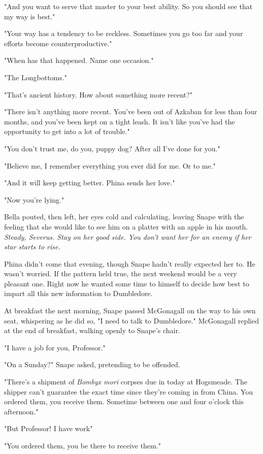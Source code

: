 "And you want to serve that master to your best ability. So you should see that my way is best."

"Your way has a tendency to be reckless. Sometimes you go too far and your efforts become counterproductive."

"When has that happened. Name one occasion."

"The Longbottoms."

"That's ancient history. How about something more recent?"

"There isn't anything more recent. You've been out of Azkaban for less than four months, and you've been kept on a tight leash. It isn't like you've had the opportunity to get into a lot of trouble."

"You don't trust me, do you, puppy dog? After all I've done for you."

"Believe me, I remember everything you ever did for me. Or to me."

"And it will keep getting better. Phina sends her love."

"Now you're lying."

Bella pouted, then left, her eyes cold and calculating, leaving Snape with the feeling that she would like to see him on a platter with an apple in his mouth. \emph{Steady, Severus. Stay on her good side. You don't want her for an enemy if her star starts to rise.}

Phina didn't come that evening, though Snape hadn't really expected her to. He wasn't worried. If the pattern held true, the next weekend would be a very pleasant one. Right now he wanted some time to himself to decide how best to impart all this new information to Dumbledore.

At breakfast the next morning, Snape passed McGonagall on the way to his own seat, whispering as he did so, "I need to talk to Dumbledore." McGonagall replied at the end of breakfast, walking openly to Snape's chair.

"I have a job for you, Professor."

"On a Sunday?" Snape asked, pretending to be offended.

"There's a shipment of \emph{Bombyx mori} corpses due in today at Hogsmeade. The shipper can't guarantee the exact time since they're coming in from China. You ordered them, you receive them. Sometime between one and four o'clock this afternoon."

"But Professor! I have work{\el}"

"You ordered them, you be there to receive them."

